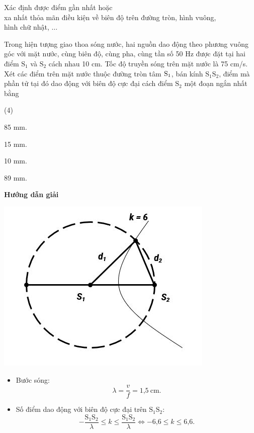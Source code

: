 \begin{dang}{Xác định được điểm gần nhất hoặc\\ xa nhất thỏa mãn điều kiện về biên độ trên đường tròn, hình vuông,\\ hình chữ nhật, $\ldots$}
	{Trong hiện tượng giao thoa sóng nước, hai nguồn dao động theo phương vuông góc với mặt nước, cùng biên độ, cùng pha, cùng tần số 50 Hz được đặt tại hai điểm $\text{S}_1$ và $\text{S}_2$ cách nhau 10 cm. Tốc độ truyền sóng trên mặt nước là 75 cm/s. Xét các điểm trên mặt nước thuộc đường tròn tâm $\text S_1$, bán kính $\text{S}_1\text{S}_2$, điểm mà phần tử tại đó dao động với biên độ cực đại cách điểm $\text{S}_2$ một đoạn ngắn nhất bằng
		\begin{mcq}(4)
			\item 85 mm.     
			\item 15 mm.    
			\item 10 mm.     
			\item 89 mm.
		\end{mcq}
	}
	{
		\begin{center}
			\textbf{Hướng dẫn giải}
			
			\vspace*{1em}
			\includegraphics[scale=0.8]{../figs/VN12-PH-11-A-007-4-V2-4.JPG}
		\end{center}
		\begin{itemize}
			\item Bước sóng: 
			\begin{equation*}
				\lambda = \dfrac{v}{f}=\text{1,5}\ \text{cm}.
			\end{equation*}
			\item Số điểm dao động với biên độ cực đại trên $\text{S}_1\text{S}_2$:
			\begin{equation*}
				-\dfrac{\text{S}_1\text{S}_2}{\lambda} \leq k \leq \dfrac{\text{S}_1\text{S}_2}{\lambda} \Leftrightarrow -\text{6,6} \leq k \leq \text{6,6}.
			\end{equation*}
			

\end{itemize}}
\end{dang}

